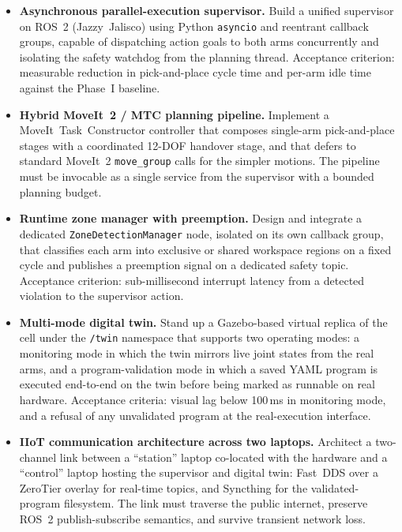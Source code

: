 \begin{itemize}
    \item \textbf{Asynchronous parallel-execution supervisor.} Build a unified supervisor on ROS~2 (Jazzy~Jalisco) using Python \texttt{asyncio} and reentrant callback groups, capable of dispatching action goals to both arms concurrently and isolating the safety watchdog from the planning thread. Acceptance criterion: measurable reduction in pick-and-place cycle time and per-arm idle time against the Phase~I baseline.

    \item \textbf{Hybrid MoveIt~2 / MTC planning pipeline.} Implement a MoveIt~Task~Constructor controller that composes single-arm pick-and-place stages with a coordinated 12-DOF handover stage, and that defers to standard MoveIt~2 \texttt{move\_group} calls for the simpler motions. The pipeline must be invocable as a single service from the supervisor with a bounded planning budget.

    \item \textbf{Runtime zone manager with preemption.} Design and integrate a dedicated \texttt{ZoneDetectionManager} node, isolated on its own callback group, that classifies each arm into exclusive or shared workspace regions on a fixed cycle and publishes a preemption signal on a dedicated safety topic. Acceptance criterion: sub-millisecond interrupt latency from a detected violation to the supervisor action.

    \item \textbf{Multi-mode digital twin.} Stand up a Gazebo-based virtual replica of the cell under the \texttt{/twin} namespace that supports two operating modes: a monitoring mode in which the twin mirrors live joint states from the real arms, and a program-validation mode in which a saved YAML program is executed end-to-end on the twin before being marked as runnable on real hardware. Acceptance criteria: visual lag below 100\,ms in monitoring mode, and a refusal of any unvalidated program at the real-execution interface.

    \item \textbf{IIoT communication architecture across two laptops.} Architect a two-channel link between a ``station'' laptop co-located with the hardware and a ``control'' laptop hosting the supervisor and digital twin: Fast~DDS over a ZeroTier overlay for real-time topics, and Syncthing for the validated-program filesystem. The link must traverse the public internet, preserve ROS~2 publish-subscribe semantics, and survive transient network loss.


\end{itemize}
